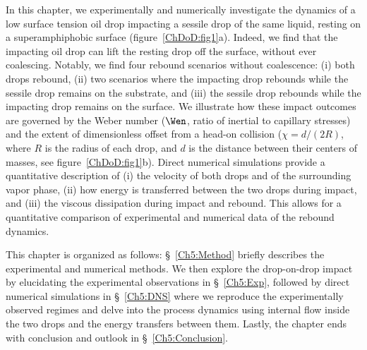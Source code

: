In this chapter, we experimentally and numerically investigate the dynamics of a low surface tension oil drop impacting a sessile drop of the same liquid, resting on a superamphiphobic surface (figure~\ref{ChDoD:fig1}a). Indeed, we find that the impacting oil drop can lift the resting drop off the surface, without ever coalescing. Notably, we find four rebound scenarios without coalescence: (i) both drops rebound, (ii) two scenarios where the impacting drop rebounds while the sessile drop remains on the substrate, and (iii) the sessile drop rebounds while the impacting drop remains on the surface. We illustrate how these impact outcomes are governed by the Weber number ($\Wen$, ratio of inertial to capillary stresses) and the extent of dimensionless offset from a head-on collision ($\chi = d/(2R)$, where $R$ is the radius of each drop, and $d$ is the distance between their centers of masses, see figure~\ref{ChDoD:fig1}b). Direct numerical simulations provide a quantitative description of (i) the velocity of both drops and of the surrounding vapor phase, (ii) how energy is transferred between the two drops during impact, and (iii) the viscous dissipation during impact and rebound. This allows for a quantitative comparison of experimental and numerical data of the rebound dynamics.

This chapter is organized as follows: \S~\ref{Ch5:Method} briefly describes the experimental and numerical methods. We then explore the drop-on-drop impact by elucidating the experimental observations in \S~\ref{Ch5:Exp}, followed by direct numerical simulations in \S~\ref{Ch5:DNS} where we reproduce the experimentally observed regimes and delve into the process dynamics using internal flow inside the two drops and the energy transfers between them. Lastly, the chapter ends with conclusion and outlook in \S~\ref{Ch5:Conclusion}.

